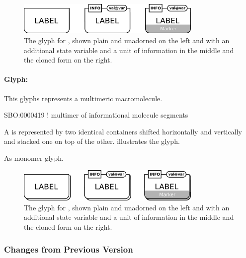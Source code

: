 \begin{figure}[H]
  \centering
  \includegraphics[width = 3.5in]{images/genetic}
  \caption{The \PD glyph for , shown plain and
    unadorned on the left and with an additional state variable and a
    unit of information in the middle and the cloned form on the right.} 
  \label{fig:genetic}
\end{figure}

\paragraph{Glyph: }

This glyphs represents a multimeric macromolecule.

\begin{glyphDescription}

\glyphSboTerm SBO:0000419 ! multimer of informational molecule segments 

\glyphContainer A  is represented by two identical containers shifted horizontally and vertically and stacked one on top of the other.   illustrates the glyph.

\glyphLabel As monomer glyph.

\end{glyphDescription}

\begin{figure}[H]
  \centering
  \includegraphics[width = 3.5in]{images/geneticMultimer}
  \caption{The \PD glyph for , shown plain and
    unadorned on the left and with an additional state variable and a
    unit of information in the middle and the cloned form on the right.} 
  \label{fig:genetic-multimer}
\end{figure}

\subsubsection{Changes from Previous Version}

